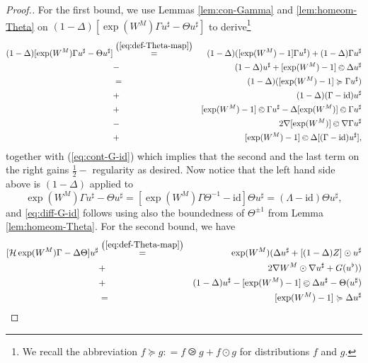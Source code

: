 \begin{proof}[Proof.]
  For the first bound, we use Lemmas \ref{lem:con-Gamma} and
  \ref{lem:homeom-Theta} on $(1 - \Delta) [\exp (W^M) \Gamma u^{\sharp} -
  \Theta u^{\sharp}]$ to derive\footnote{We recall the abbreviation $f
  \succcurlyeq g : = f \ogreaterthan g + f \odot g$ for distributions $f$ and
  $g$. }
   \begin{eqnarray*}
    (1 - \Delta) [\exp (W^M) \Gamma u^{\sharp} - \Theta u^{\sharp}] &
    \overset{\left( \ref{eq:def-Theta-map} \right)}{=} & (1 - \Delta) ([\exp
    (W^M) - 1] \Gamma u^{\sharp}) + (1 - \Delta) \Gamma u^{\sharp}\\
    &  -  &(1 - \Delta) u^{\sharp} + [\exp (W^M) - 1] \olessthan \Delta
    u^{\sharp}\\
    & = &  (1 - \Delta) ([\exp (W^M) - 1] \succcurlyeq \Gamma u^{\sharp}) \\
    & + & (1
    - \Delta) (\Gamma - \mathrm{id}) u^{\sharp}\\
    &   + & [\exp (W^M) - 1] \olessthan \Gamma u^{\sharp} - \Delta [\exp
    (W^M)] \olessthan \Gamma u^{\sharp}\\
    &  -  &2 \nabla [\exp (W^M)] \olessthan \nabla \Gamma u^{\sharp}\\
    &  + & [\exp (W^M) - 1] \olessthan \Delta [(\Gamma - \mathrm{id})
    u^{\sharp}],
      \end{eqnarray*}
  together with (\ref{eq:cont-G-id}) which implies that the second and the
  last term on the right gains $\frac{1}{2} -$ regularity as desired. Now notice
  that the left hand side above is $(1 - \Delta)$ applied to
  \[ \exp (W^M) \Gamma u^{\sharp} - \Theta u^{\sharp} = [\exp (W^M) \Gamma
     \Theta^{- 1} - \mathrm{id}] \Theta u^{\sharp} = (\Lambda - \mathrm{id})
     \Theta u^{\sharp}, \]
  and \eqref{eq:diff-G-id} follows using also the boundedness of $\Theta^{\pm
  1}$ from Lemma \ref{lem:homeom-Theta}. For the second bound, we have
  \begin{eqnarray*}
    {}[\mathcal{H} \exp (W^M) \Gamma - \Delta \Theta] u^{\sharp} &
    \overset{\left( \ref{eq:def-Theta-map} \right)}{=} & \exp (W^M) (\Delta
    u^{\sharp} + [(1 - \Delta) Z] \odot u^{\sharp}\\
    & + & 2 \nabla W^M \odot \nabla
    u^{\sharp} + G (u^{\flat}))\\
    & + & (1 - \Delta) u^{\sharp} - [\exp (W^M) - 1] \olessthan \Delta
    u^{\sharp} - \Theta (u^{\sharp})\\
    & = & [\exp (W^M) - 1] \succcurlyeq \Delta u^{\sharp} \\

\end{eqnarray*}
\end{proof}
